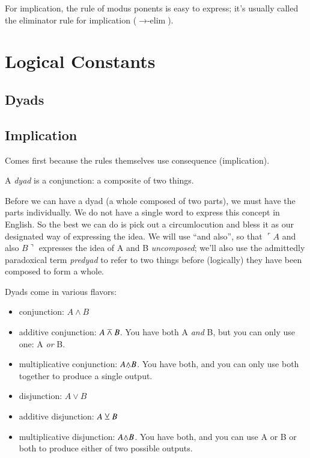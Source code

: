 \documentclass{article}
\begin{document}
For implication, the rule of modus ponents is easy to express; it's
usually called the eliminator rule for implication
(\(\rightarrow\text{-elim}\)).

\section{Logical Constants}

\subsection{Dyads}

\subsection{Implication}

Comes first because the rules themselves use consequence (implication).

A \textit{dyad} is a conjunction: a composite of two things.

Before we can have a dyad (a whole composed of two parts), we must
have the parts individually. We do not have a single word to express
this concept in English. So the best we can do is pick out a
circumlocution and bless it as our designated way of expressing the
idea. We will use ``and also'', so that \(\ulcorner A\) and also
\(B\urcorner\) expresses the idea of A and B \textit{uncomposed};
we'll also use the admittedly paradoxical term \textit{predyad} to
refer to two things before (logically) they have been composed to form
a whole.

Dyads come in various flavors:

\begin{itemize}
\item conjunction: \(A\land B\)
\item additive conjunction: \(A \barwedge B\). You have both A
  \textit{and} B, but you can only use one: A \textit{or} B.
\item multiplicative conjunction: \(A\fusion B\). You have both, and
  you can only use both together to produce a single output.
\item disjunction: \(A\lor B\)
\item additive disjunction: \(A \veebar B\)
\item multiplicative disjunction: \(A\fusion B\). You have both, and
  you can use A or B or both to produce either of two possible outputs.
\end{itemize}
\end{document}
